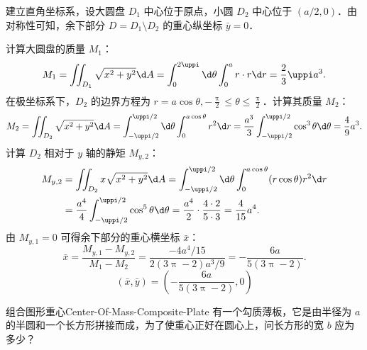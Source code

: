 \begin{solution}
    建立直角坐标系，设大圆盘 $D_1$ 中心位于原点，小圆 $D_2$ 中心位于 $(a/2, 0)$．由对称性可知，余下部分 $D = D_1 \setminus D_2$ 的重心纵坐标 $\bar{y} = 0$．

    计算大圆盘的质量 $M_1$：
    \begin{equation}\label{eq:mass-total}
        M_1 = \iint_{D_1} \sqrt{x^2+y^2} \d A = \int_0^{2\uppi} \d \theta \int_0^a r \cdot r \d r = \frac{2}{3} \uppi a^3.
    \end{equation}
    在极坐标系下，$D_2$ 的边界方程为 $r = a \cos \theta, -\frac{\uppi}{2} \le \theta \le \frac{\uppi}{2}$．计算其质量 $M_2$：
    \begin{equation}\label{eq:mass-sub}
        M_2 = \iint_{D_2} \sqrt{x^2+y^2} \d A = \int_{-\uppi/2}^{\uppi/2} \d \theta \int_0^{a \cos \theta} r^2 \d r = \frac{a^3}{3} \int_{-\uppi/2}^{\uppi/2} \cos^3 \theta \d \theta = \frac{4}{9} a^3.
    \end{equation}
    计算 $D_2$ 相对于 $y$ 轴的静矩 $M_{y,2}$：
    \begin{equation}\label{eq:stat-moment}
        \begin{aligned}
            M_{y,2} & = \iint_{D_2} x \sqrt{x^2+y^2} \d A = \int_{-\uppi/2}^{\uppi/2} \d \theta \int_0^{a \cos \theta} (r \cos \theta) r^2 \d r               \\
                    & = \frac{a^4}{4} \int_{-\uppi/2}^{\uppi/2} \cos^5 \theta \d \theta = \frac{a^4}{2} \cdot \frac{4 \cdot 2}{5 \cdot 3} = \frac{4}{15} a^4.
        \end{aligned}
    \end{equation}
    由 $M_{y,1} = 0$ 可得余下部分的重心横坐标 $\bar{x}$：
    \begin{equation}\label{eq:coord-calc}
        \bar{x} = \frac{M_{y,1} - M_{y,2}}{M_1 - M_2} = \frac{-4a^4/15}{2(3\uppi - 2)a^3/9} = - \frac{6a}{5(3\uppi - 2)}.
    \end{equation}
    \begin{equation}
        \boxed{(\bar{x}, \bar{y}) = \left( -\frac{6a}{5(3\uppi - 2)}, 0 \right)}
    \end{equation}
\end{solution}

\begin{problem}{组合图形重心}{Center-Of-Mass-Composite-Plate}
    有一个勾质薄板，它是由半径为 $a$ 的半圆和一个长方形拼接而成，为了使重心正好在圆心上，问长方形的宽 $b$ 应为多少？
\end{problem}


